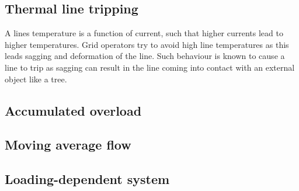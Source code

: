 \documentclass{article}
\begin{document}
\subsection{Thermal line tripping}

A lines temperature is a function of current, such that higher currents lead to higher temperatures. Grid operators try to avoid high line temperatures as this leads sagging and deformation of the line. Such behaviour is known to cause a line to trip as sagging can result in the line coming into contact with an external object like a tree. 

\subsection{Accumulated overload}

\subsection{Moving average flow}

\subsection{Loading-dependent system}
\end{document}
